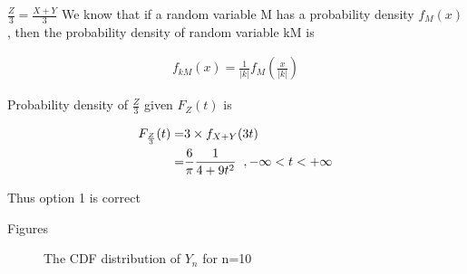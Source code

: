 \documentclass{beamer}
\providecommand{\brak}[1]{\ensuremath{\left(#1\right)}}
\providecommand{\abs}[1]{\vert#1\vert}
\begin{document}
\begin{frame}{$\frac{Z}{3} = \frac{X+Y}{3}$}
  We know that if a random variable M has a probability density $f_M(x)$, then the probability density of random variable kM is
  \begin{block}{}
    \begin{align}
      f_{kM}\brak{x} = \frac{1}{\abs{k}} f_M\brak{\frac{x}{\abs{k}}}
    \end{align}
  \end{block}
  Probability density of $\frac{Z}{3}$ given $F_Z(t)$ is
  \begin{block}{}
    \begin{align}
      F_{\frac{Z}{3}}(t) = & 3\times \displaystyle f_{X+Y}(3t)                                 \\
      =                    & \frac{6}{\pi} \frac{1}{4+9{t}^2}\hspace{0.2cm}, -\infty<t<+\infty
    \end{align}
    \begin{center}
      Thus option 1 is correct
    \end{center}
  \end{block}
\end{frame}
\begin{frame}{Figures}
  \begin{figure}[!ht]
    \centering
    \caption{The CDF distribution of $Y_n$ for n=10}
    \label{rect}
  \end{figure}
\end{frame}
\end{document}

